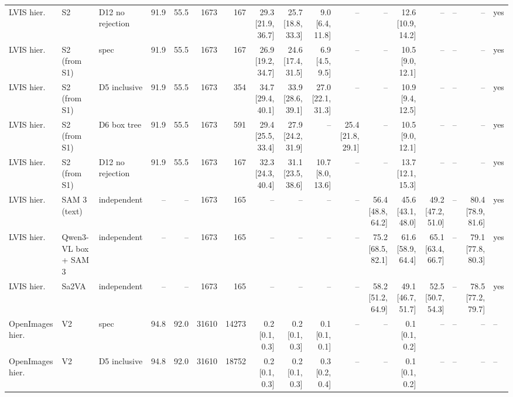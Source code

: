 \begin{tabular}{lllrrrrrrrrrrrrrl}
LVIS hier. & S2 & D12 no rejection & 91.9 & 55.5 & 1673 & 167 & 29.3 \scriptsize{[21.9, 36.7]} & 25.7 \scriptsize{[18.8, 33.3]} & 9.0 \scriptsize{[6.4, 11.8]} & -- & -- & 12.6 \scriptsize{[10.9, 14.2]} & -- & -- & -- & yes \\
LVIS hier. & S2 (from S1) & spec & 91.9 & 55.5 & 1673 & 167 & 26.9 \scriptsize{[19.2, 34.7]} & 24.6 \scriptsize{[17.4, 31.5]} & 6.9 \scriptsize{[4.5, 9.5]} & -- & -- & 10.5 \scriptsize{[9.0, 12.1]} & -- & -- & -- & yes \\
LVIS hier. & S2 (from S1) & D5 inclusive & 91.9 & 55.5 & 1673 & 354 & 34.7 \scriptsize{[29.4, 40.1]} & 33.9 \scriptsize{[28.6, 39.1]} & 27.0 \scriptsize{[22.1, 31.3]} & -- & -- & 10.9 \scriptsize{[9.4, 12.5]} & -- & -- & -- & yes \\
LVIS hier. & S2 (from S1) & D6 box tree & 91.9 & 55.5 & 1673 & 591 & 29.4 \scriptsize{[25.5, 33.4]} & 27.9 \scriptsize{[24.2, 31.9]} & -- & 25.4 \scriptsize{[21.8, 29.1]} & -- & 10.5 \scriptsize{[9.0, 12.1]} & -- & -- & -- & yes \\
LVIS hier. & S2 (from S1) & D12 no rejection & 91.9 & 55.5 & 1673 & 167 & 32.3 \scriptsize{[24.3, 40.4]} & 31.1 \scriptsize{[23.5, 38.6]} & 10.7 \scriptsize{[8.0, 13.6]} & -- & -- & 13.7 \scriptsize{[12.1, 15.3]} & -- & -- & -- & yes \\
\midrule
LVIS hier. & SAM 3 (text) & independent & -- & -- & 1673 & 165 & -- & -- & -- & -- & 56.4 \scriptsize{[48.8, 64.2]} & 45.6 \scriptsize{[43.1, 48.0]} & 49.2 \scriptsize{[47.2, 51.0]} & -- & 80.4 \scriptsize{[78.9, 81.6]} & yes \\
LVIS hier. & Qwen3-VL box + SAM 3 & independent & -- & -- & 1673 & 165 & -- & -- & -- & -- & 75.2 \scriptsize{[68.5, 82.1]} & 61.6 \scriptsize{[58.9, 64.4]} & 65.1 \scriptsize{[63.4, 66.7]} & -- & 79.1 \scriptsize{[77.8, 80.3]} & yes \\
LVIS hier. & Sa2VA & independent & -- & -- & 1673 & 165 & -- & -- & -- & -- & 58.2 \scriptsize{[51.2, 64.9]} & 49.1 \scriptsize{[46.7, 51.7]} & 52.5 \scriptsize{[50.7, 54.3]} & -- & 78.5 \scriptsize{[77.2, 79.7]} & yes \\
\midrule
OpenImages hier. & V2 & spec & 94.8 & 92.0 & 31610 & 14273 & 0.2 \scriptsize{[0.1, 0.3]} & 0.2 \scriptsize{[0.1, 0.3]} & 0.1 \scriptsize{[0.1, 0.1]} & -- & -- & 0.1 \scriptsize{[0.1, 0.2]} & -- & -- & -- & -- \\
OpenImages hier. & V2 & D5 inclusive & 94.8 & 92.0 & 31610 & 18752 & 0.2 \scriptsize{[0.1, 0.3]} & 0.2 \scriptsize{[0.1, 0.3]} & 0.3 \scriptsize{[0.2, 0.4]} & -- & -- & 0.1 \scriptsize{[0.1, 0.2]} & -- & -- & -- & -- \\

\end{tabular}
